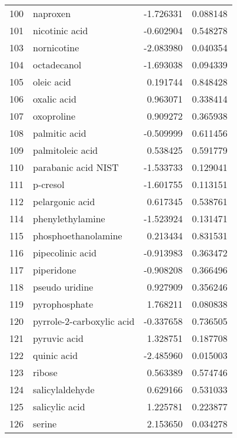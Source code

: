 \begin{tabular}{llrr}
100 &                           naproxen & -1.726331 &  0.088148 \\
101 &                     nicotinic acid & -0.602904 &  0.548278 \\
103 &                        nornicotine & -2.083980 &  0.040354 \\
104 &                        octadecanol & -1.693038 &  0.094339 \\
105 &                         oleic acid &  0.191744 &  0.848428 \\
106 &                        oxalic acid &  0.963071 &  0.338414 \\
107 &                         oxoproline &  0.909272 &  0.365938 \\
108 &                      palmitic acid & -0.509999 &  0.611456 \\
109 &                   palmitoleic acid &  0.538425 &  0.591779 \\
110 &                parabanic acid NIST & -1.533733 &  0.129041 \\
111 &                           p-cresol & -1.601755 &  0.113151 \\
112 &                    pelargonic acid &  0.617345 &  0.538761 \\
114 &                   phenylethylamine & -1.523924 &  0.131471 \\
115 &                phosphoethanolamine &  0.213434 &  0.831531 \\
116 &                   pipecolinic acid & -0.913983 &  0.363472 \\
117 &                         piperidone & -0.908208 &  0.366496 \\
118 &                     pseudo uridine &  0.927909 &  0.356246 \\
119 &                      pyrophosphate &  1.768211 &  0.080838 \\
120 &          pyrrole-2-carboxylic acid & -0.337658 &  0.736505 \\
121 &                       pyruvic acid &  1.328751 &  0.187708 \\
122 &                        quinic acid & -2.485960 &  0.015003 \\
123 &                             ribose &  0.563389 &  0.574746 \\
124 &                    salicylaldehyde &  0.629166 &  0.531033 \\
125 &                     salicylic acid &  1.225781 &  0.223877 \\
126 &                             serine &  2.153650 &  0.034278 \\

\end{tabular}
